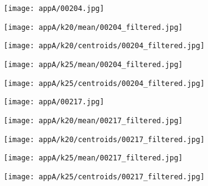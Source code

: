 \documentclass[draft,final]{vutinfth} %
\begin{document}
\begin{appendices}
\begin{figure}[h]
\centering
  \begin{subfigure}[t]{0.19\columnwidth}
    \centering
    \texttt{[image: appA/00204.jpg]}
  \end{subfigure}
  \begin{subfigure}[t]{0.19\columnwidth}
    \centering
    \texttt{[image: appA/k20/mean/00204\_filtered.jpg]}
  \end{subfigure}
  \begin{subfigure}[t]{0.19\columnwidth}
    \centering
    \texttt{[image: appA/k20/centroids/00204\_filtered.jpg]}
  \end{subfigure}
  \begin{subfigure}[t]{0.19\columnwidth}
    \centering
    \texttt{[image: appA/k25/mean/00204\_filtered.jpg]}
  \end{subfigure}
  \begin{subfigure}[t]{0.19\columnwidth}
    \centering
    \texttt{[image: appA/k25/centroids/00204\_filtered.jpg]}
  \end{subfigure}
\caption{}
  \label{appA:204}
\end{figure}  

\begin{figure}[h]
\centering
  \begin{subfigure}[t]{0.19\columnwidth}
    \centering
    \texttt{[image: appA/00217.jpg]}
  \end{subfigure}
  \begin{subfigure}[t]{0.19\columnwidth}
    \centering
    \texttt{[image: appA/k20/mean/00217\_filtered.jpg]}
  \end{subfigure}
  \begin{subfigure}[t]{0.19\columnwidth}
    \centering
    \texttt{[image: appA/k20/centroids/00217\_filtered.jpg]}
  \end{subfigure}
  \begin{subfigure}[t]{0.19\columnwidth}
    \centering
    \texttt{[image: appA/k25/mean/00217\_filtered.jpg]}
  \end{subfigure}
  \begin{subfigure}[t]{0.19\columnwidth}
    \centering
    \texttt{[image: appA/k25/centroids/00217\_filtered.jpg]}
  \end{subfigure}
\caption{}
\label{appA:217}
\end{figure}  


\end{appendices}
\end{document}
